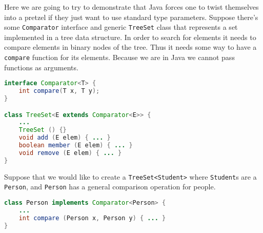 \documentclass{article}
\begin{document}
\begin{example}
Here we are going to try to demonstrate that Java forces one to twist themselves into a pretzel if they just want to use standard type parameters.
Suppose there's some \texttt{Comparator} interface and generic \texttt{TreeSet} class that represents a set implemented in a tree data structure.
In order to search for elements it needs to compare elements in binary nodes of the tree.
Thus it needs some way to have a \texttt{compare} function for its elements.
Because we are in Java we cannot pass functions as arguments.
\begin{lstlisting}[language=Java]
interface Comparator<T> {
    int compare(T x, T y);
}

class TreeSet<E extends Comparator<E>> {
    ...
    TreeSet () {}
    void add (E elem) { ... }
    boolean member (E elem) { ... }
    void remove (E elem) { ... }
}
\end{lstlisting}
Suppose that we would like to create a \texttt{TreeSet<Student>} where \texttt{Student}s are a \texttt{Person}, and \texttt{Person} has a general comparison operation for people.
\begin{lstlisting}[language=Java]
class Person implements Comparator<Person> {
    ...
    int compare (Person x, Person y) { ... }
}


\end{lstlisting}
\end{example}
\end{document}
